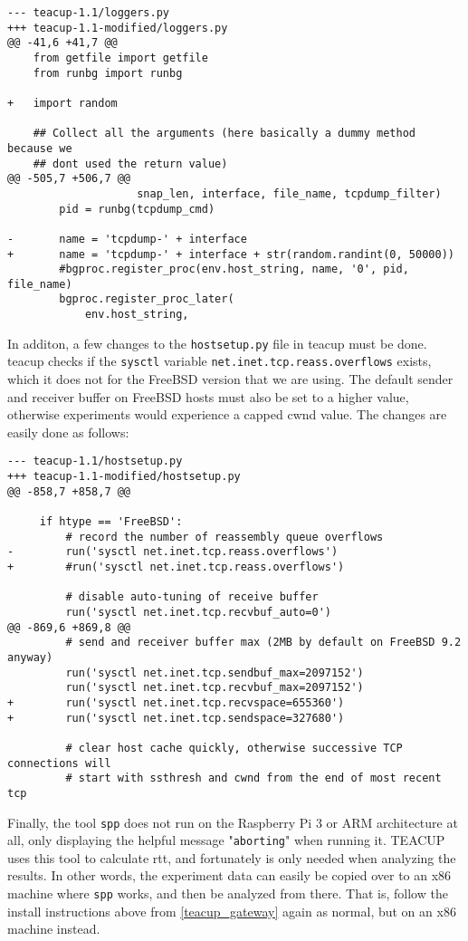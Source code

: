 \begin{verbatim}
--- teacup-1.1/loggers.py
+++ teacup-1.1-modified/loggers.py
@@ -41,6 +41,7 @@
    from getfile import getfile
    from runbg import runbg
    
+   import random
    
    ## Collect all the arguments (here basically a dummy method because we
    ## dont used the return value)
@@ -505,7 +506,7 @@
                    snap_len, interface, file_name, tcpdump_filter)
        pid = runbg(tcpdump_cmd)
    
-       name = 'tcpdump-' + interface
+       name = 'tcpdump-' + interface + str(random.randint(0, 50000))
        #bgproc.register_proc(env.host_string, name, '0', pid, file_name)
        bgproc.register_proc_later(
            env.host_string,
\end{verbatim}

In additon, a few changes to the \lstinline{hostsetup.py} file in \gls{teacup} must be done. \gls{teacup} checks if the \lstinline{sysctl} variable \lstinline{net.inet.tcp.reass.overflows} exists, which it does not for the FreeBSD version that we are using. The default sender and receiver buffer on FreeBSD hosts must also be set to a higher value, otherwise experiments would experience a capped \gls{cwnd} value. The changes are easily done as follows:

\begin{verbatim}
--- teacup-1.1/hostsetup.py
+++ teacup-1.1-modified/hostsetup.py
@@ -858,7 +858,7 @@
 
     if htype == 'FreeBSD':
         # record the number of reassembly queue overflows
-        run('sysctl net.inet.tcp.reass.overflows')
+        #run('sysctl net.inet.tcp.reass.overflows')
 
         # disable auto-tuning of receive buffer
         run('sysctl net.inet.tcp.recvbuf_auto=0')
@@ -869,6 +869,8 @@
         # send and receiver buffer max (2MB by default on FreeBSD 9.2 anyway)
         run('sysctl net.inet.tcp.sendbuf_max=2097152')
         run('sysctl net.inet.tcp.recvbuf_max=2097152')
+        run('sysctl net.inet.tcp.recvspace=655360')
+        run('sysctl net.inet.tcp.sendspace=327680')
 
         # clear host cache quickly, otherwise successive TCP connections will
         # start with ssthresh and cwnd from the end of most recent tcp
\end{verbatim}

Finally, the tool \lstinline{spp} does not run on the Raspberry Pi 3 or ARM architecture at all, only displaying the helpful message "\lstinline{aborting}" when running it. TEACUP uses this tool to calculate \gls{rtt}, and fortunately is only needed when analyzing the results. In other words, the experiment data can easily be copied over to an x86 machine where \lstinline{spp} works, and then be analyzed from there. That is, follow the install instructions above from \ref{teacup_gateway} again as normal, but on an x86 machine instead.








